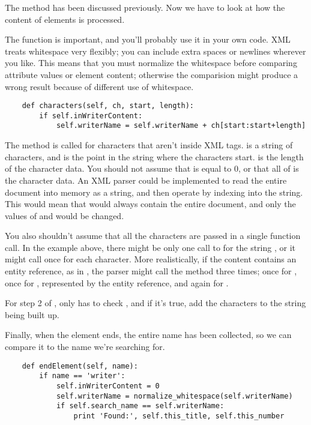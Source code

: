 \documentclass{howto}
\newcommand{\element}[1]{\code{#1}}
\begin{document}
The  method has been discussed previously.  Now
we have to look at how the content of elements is processed.  

The  function is important, and
you'll probably use it in your own code.  XML treats whitespace very
flexibly; you can include extra spaces or newlines wherever you like.
This means that you must normalize the whitespace before comparing
attribute values or element content; otherwise the comparision might
produce a wrong result because of different use of whitespace.

\begin{verbatim}
    def characters(self, ch, start, length):
        if self.inWriterContent:
            self.writerName = self.writerName + ch[start:start+length]
\end{verbatim}

The  method is called for characters that aren't
inside XML tags.   is a string of characters, and 
is the point in the string where the characters
start.   is the length of the character data.  You should
not assume that  is equal to 0, or that all of  is
the character data.  An XML parser could be implemented to read the
entire document into memory as a string, and then operate by indexing
into the string.   This would mean that  would always contain
the entire document, and only the values of  and
 would be changed.  

You also shouldn't assume that all the characters are passed in a
single function call.  In the example above, there might be only one
call to  for the string , or
it might call  once for each character.  More
realistically, if the content contains an entity reference, as in
, the parser might call the method three times; once for 
, once for \samp{\&}, represented by the entity
reference, and again for .

For step 2 of ,  only has to
check , and if it's true, add the characters to
the string being built up.

Finally, when the \element{writer} element ends, the entire name has
been collected, so we can compare it to the name we're searching for.

\begin{verbatim}
    def endElement(self, name):
        if name == 'writer':
            self.inWriterContent = 0
            self.writerName = normalize_whitespace(self.writerName)
            if self.search_name == self.writerName:
                print 'Found:', self.this_title, self.this_number
\end{verbatim}
\end{document}
